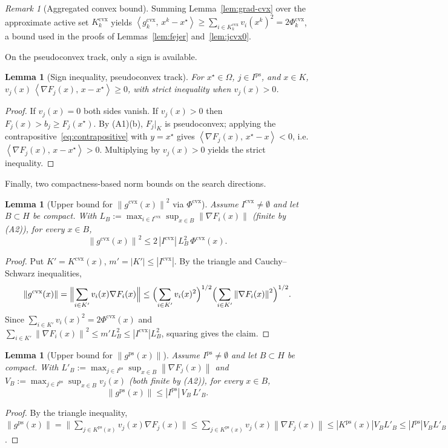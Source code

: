 \documentclass[]{interact}
\theoremstyle{plain}
\newtheorem{lemma}[theorem]{Lemma}
\theoremstyle{definition}
\theoremstyle{remark}
\newtheorem{remark}{Remark}
\newcommand{\norm}[1]{\left\lVert #1 \right\rVert}
\newcommand{\abs}[1]{\left\lvert #1 \right\rvert}
\newcommand{\inner}[2]{\left\langle #1,\, #2 \right\rangle}
\newcommand{\cvx}{\mathrm{cvx}}
\newcommand{\ps}{\mathrm{ps}}
\begin{document}
\begin{remark}[Aggregated convex bound]\label{rem:grad-cvx-sum}
Summing Lemma~\ref{lem:grad-cvx} over the approximate active set $K^{\cvx}_k$ yields
$\inner{g^{\cvx}_k}{x^k-x^\star}\ge\sum_{i\in K^{\cvx}_k}v_i(x^k)^2=2\Phi^{\cvx}_k$, a bound
used in the proofs of Lemmas~\ref{lem:fejer} and~\ref{lem:jcvx0}.
\end{remark}

On the pseudoconvex track, only a sign is available.

\begin{lemma}[Sign inequality, pseudoconvex track]\label{lem:sign-ps}
For $x^\star\in\Omega$, $j\in I^{\ps}$, and $x\in K$,
$v_j(x)\,\inner{\nabla F_j(x)}{x-x^\star}\ge 0$, with strict inequality when $v_j(x)>0$.
\end{lemma}
\begin{proof}
If $v_j(x)=0$ both sides vanish. If $v_j(x)>0$ then $F_j(x)>b_j\ge F_j(x^\star)$. By
(A1)(b), $F_j|_K$ is pseudoconvex; applying the contrapositive~\eqref{eq:contrapositive}
with $y=x^\star$ gives $\inner{\nabla F_j(x)}{x^\star-x}<0$, i.e.
$\inner{\nabla F_j(x)}{x-x^\star}>0$. Multiplying by $v_j(x)>0$ yields the strict
inequality.
\end{proof}

Finally, two compactness-based norm bounds on the search directions.

\begin{lemma}[Upper bound for $\norm{g^{\cvx}(x)}^2$ via $\Phi^{\cvx}$]\label{lem:bound-cvx}
Assume $I^{\cvx}\ne\emptyset$ and let $B\subset H$ be compact. With
$L_B:=\max_{i\in I^{\cvx}}\sup_{x\in B}\norm{\nabla F_i(x)}$ (finite by (A2)), for every
$x\in B$,
\[
\norm{g^{\cvx}(x)}^2\le 2\,\abs{I^{\cvx}}\,L_B^2\,\Phi^{\cvx}(x).
\]
\end{lemma}
\begin{proof}
Put $K'=K^{\cvx}(x)$, $m'=\abs{K'}\le\abs{I^{\cvx}}$. By the triangle and Cauchy--Schwarz
inequalities,
\[
\norm{g^{\cvx}(x)}=\Bigl\|\sum_{i\in K'}v_i(x)\nabla F_i(x)\Bigr\|
\le\Bigl(\sum_{i\in K'}v_i(x)^2\Bigr)^{1/2}\Bigl(\sum_{i\in K'}\norm{\nabla F_i(x)}^2\Bigr)^{1/2}.
\]
Since $\sum_{i\in K'}v_i(x)^2=2\Phi^{\cvx}(x)$ and
$\sum_{i\in K'}\norm{\nabla F_i(x)}^2\le m'L_B^2\le\abs{I^{\cvx}}L_B^2$, squaring gives the
claim.
\end{proof}

\begin{lemma}[Upper bound for $\norm{g^{\ps}(x)}$]\label{lem:bound-ps}
Assume $I^{\ps}\ne\emptyset$ and let $B\subset H$ be compact. With
$L'_B:=\max_{j\in I^{\ps}}\sup_{x\in B}\norm{\nabla F_j(x)}$ and
$V_B:=\max_{j\in I^{\ps}}\sup_{x\in B}v_j(x)$ (both finite by (A2)), for every $x\in B$,
\[
\norm{g^{\ps}(x)}\le\abs{I^{\ps}}\,V_B\,L'_B .
\]
\end{lemma}
\begin{proof}
By the triangle inequality,
$\norm{g^{\ps}(x)}=\bigl\|\sum_{j\in K^{\ps}(x)}v_j(x)\nabla F_j(x)\bigr\|
\le\sum_{j\in K^{\ps}(x)}v_j(x)\norm{\nabla F_j(x)}\le\abs{K^{\ps}(x)}V_BL'_B
\le\abs{I^{\ps}}V_BL'_B$.
\end{proof}
\end{document}
